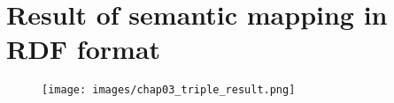 
\chapter{Result of semantic mapping in RDF format}
\begin{center}
	\begin{figure}[htb!]
		
		\begin{minipage}{0.35\linewidth}
			\centering
			\texttt{[image: images/chap03\_triple\_result.png]}
		\end{minipage}
		
	\end{figure}
	
\end{center}